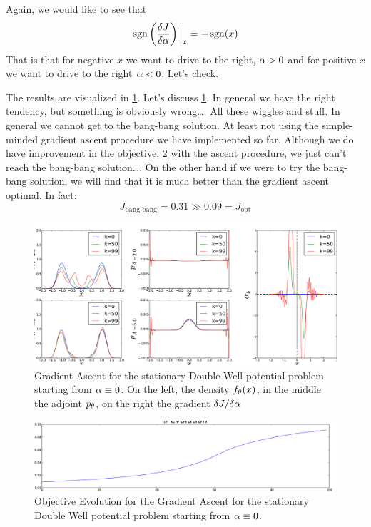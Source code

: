 \documentclass{article}
\begin{document}
Again, we would like to see that 
$$ \operatorname{sgn} \left(\frac {\delta J}{\delta {\alpha}}\right) \Big|_{x} = - \operatorname{sgn}(x)$$
That is that for negative $x$ we want to drive to the right, ${\alpha} > 0$ and for
positive $x$ we want to drive to the right ${\alpha} < 0$. 
Let's check.  

The results are visualized in \cref{fig:FBSoln_doublewell_stationary_iterates}. Let's
discuss \cref{fig:FBSoln_doublewell_stationary_iterates}. In general we have
the right tendency, but something is obviously wrong\ldots. All these wiggles
and stuff. In general we cannot get to the bang-bang solution. At least not
using the simple-minded gradient ascent procedure we have implemented so far.  
Although we do have improvement in the objective,
\cref{fig:FBSoln_doublewell_stationary_objective_ascent} with the ascent
procedure, we just can't reach the bang-bang solution\ldots. On the other hand if we were
to try the bang-bang solution, we will find that it is much better than the
gradient ascent optimal. In fact:
$$
J_{\textrm{bang-bang}} =  0.31 \gg 0.09 = J_{\textrm{opt} } 
$$

\begin{figure}[htp]
\begin{center} 
  \includegraphics[width=\textwidth]{Figs/DoublewellFBStatinoary/FB_alpha_iterates_example.pdf}
  \caption[labelInTOC]{Gradient Ascent for the stationary Double-Well potential problem starting from ${\alpha} \equiv 0$. On the left, the density ${ f_{\theta}}(x)$, in the middle
  the adjoint ${ p_{\theta}}$, on the right the gradient $\delta J/ \delta {\alpha}$}
  \label{fig:FBSoln_doublewell_stationary_iterates}
\end{center}
\end{figure}
 
\begin{figure}[htp]
\begin{center} 
  \includegraphics[width=\textwidth]{Figs/DoublewellFBStatinoary/FB_J_iterates_example.pdf}
  \caption[labelInTOC]{Objective Evolution for the Gradient Ascent for the
  stationary Double Well potential problem starting from ${\alpha} \equiv 0$.}
  \label{fig:FBSoln_doublewell_stationary_objective_ascent}
\end{center}
\end{figure}
\end{document}
